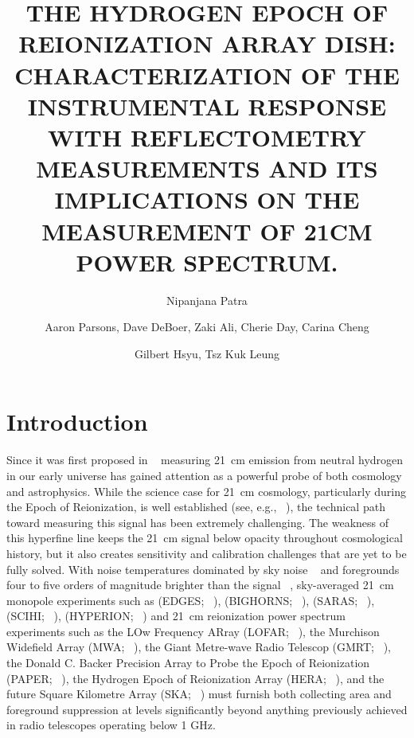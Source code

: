 \documentclass[twocolumn]{emulateapj}
\begin{document}
\title{THE HYDROGEN EPOCH OF REIONIZATION ARRAY DISH: CHARACTERIZATION OF  THE INSTRUMENTAL RESPONSE WITH REFLECTOMETRY MEASUREMENTS AND ITS IMPLICATIONS ON THE MEASUREMENT OF 21CM POWER SPECTRUM. } 

\author{Nipanjana Patra }
\author{Aaron Parsons, Dave DeBoer, Zaki Ali, Cherie Day, Carina Cheng}
\author{Gilbert Hsyu, Tsz Kuk Leung}

\begin{abstract}
\end{abstract}


\section{Introduction}

Since it was first proposed in ~\citep{Shaver_et_al1999} measuring 21~cm
emission from neutral hydrogen in our early universe has gained attention as a
powerful probe of both cosmology and astrophysics.  While the science case for
21~cm cosmology, particularly during the Epoch of Reionization, is well
established (see, e.g.,
~\citep{furlanetto_et_al2006,morales_wyithe2010,pritchard_loeb2012}),
the technical path toward measuring this signal has been extremely challenging.  The
weakness of this hyperfine line keeps the 21~cm signal below opacity throughout
cosmological history, but it also creates sensitivity and calibration
challenges that are yet to be fully solved.  With noise temperatures dominated
by sky noise ~\citep{XXX} and foregrounds four to five orders of magnitude
brighter than the signal ~\citep{XXX}, 
sky-averaged 21~cm monopole experiments such as
(EDGES; ~\citealt{XXX}),
(BIGHORNS; ~\citealt{XXX}),
(SARAS; ~\citealt{patra_et_al2014}),
(SCIHI; ~\citealt{voytek_et_al2014}),
(HYPERION; ~\citealt{presley_et_al2015})
and 21~cm reionization power spectrum experiments such as
the LOw Frequency ARray (LOFAR; ~\citealt{XXX}),
the Murchison Widefield Array (MWA; ~\citealt{XXX}),
the Giant Metre-wave Radio Telescop (GMRT; ~\citealt{XXX}),
the Donald C. Backer Precision Array to Probe the Epoch of Reionization (PAPER; ~\citealt{parsons_et_al2010}),
the Hydrogen Epoch of Reionization Array (HERA; ~\citealt{XXX}),
and the future Square Kilometre Array (SKA; ~\citealt{XXX})
must
furnish both collecting area and foreground suppression at levels significantly
beyond anything previously achieved in radio telescopes operating below 1 GHz.
\end{document}
